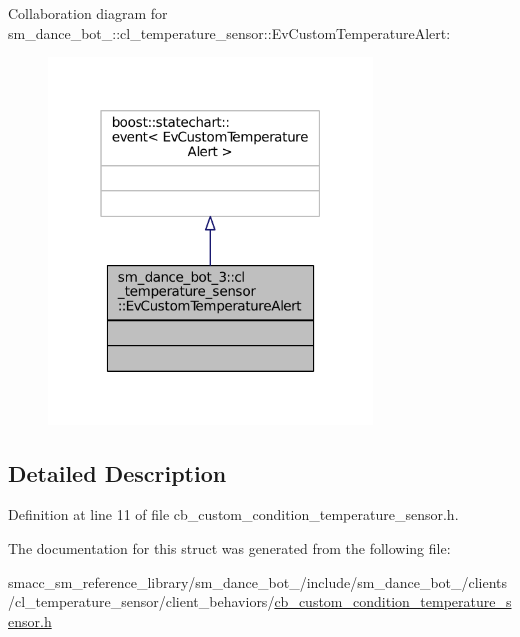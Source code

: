 Collaboration diagram for sm\+\_\+dance\+\_\+bot\+\_\+:\+:cl\+\_\+temperature\+\_\+sensor\+:\+:Ev\+Custom\+Temperature\+Alert\+:
\nopagebreak
\begin{figure}[H]
\begin{center}
\leavevmode
\includegraphics[width=244pt]{structsm__dance__bot__3_1_1cl__temperature__sensor_1_1EvCustomTemperatureAlert__coll__graph}
\end{center}
\end{figure}


\subsection{Detailed Description}


Definition at line 11 of file cb\+\_\+custom\+\_\+condition\+\_\+temperature\+\_\+sensor.\+h.



The documentation for this struct was generated from the following file\+:\begin{DoxyCompactItemize}
\item 
smacc\+\_\+sm\+\_\+reference\+\_\+library/sm\+\_\+dance\+\_\+bot\+\_/include/sm\+\_\+dance\+\_\+bot\+\_/clients/cl\+\_\+temperature\+\_\+sensor/client\+\_\+behaviors/\hyperlink{3_2include_2sm__dance__bot__3_2clients_2cl__temperature__sensor_2client__behaviors_2cb__custom__cbf235cf1c6e08e3604b00db0e3f3d0c}{cb\+\_\+custom\+\_\+condition\+\_\+temperature\+\_\+sensor.\+h}\end{DoxyCompactItemize}
